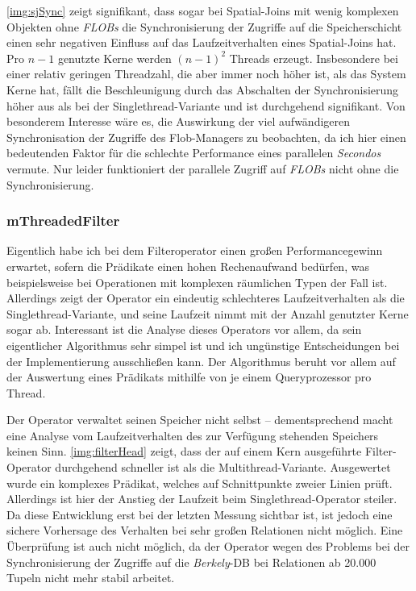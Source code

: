 \documentclass[a4paper,12pt,twoside]{article}
\newcommand{\Fb}[1]{\textit{#1}} %
\begin{document}
\autoref{img:sjSync} zeigt signifikant, dass sogar bei Spatial-Joins mit wenig komplexen Objekten ohne \Fb{FLOBs} die Synchronisierung der Zugriffe auf die Speicherschicht einen sehr negativen Einfluss auf das Laufzeitverhalten eines Spatial-Joins hat. Pro $n-1$ genutzte Kerne werden $(n-1)^2$ Threads erzeugt. Insbesondere bei einer relativ geringen Threadzahl, die aber immer noch höher ist, als das System Kerne hat, fällt die Beschleunigung durch das Abschalten der Synchronisierung höher aus als bei der Singlethread-Variante und ist durchgehend signifikant. Von besonderem Interesse wäre es, die Auswirkung der viel aufwändigeren Synchronisation der Zugriffe des Flob-Managers zu beobachten, da ich hier einen bedeutenden Faktor für die schlechte Performance eines parallelen \Fb{Secondos} vermute. Nur leider funktioniert der parallele Zugriff auf \Fb{FLOBs} nicht ohne die Synchronisierung.   

\subsubsection{mThreadedFilter}
\label{entw:filter}

Eigentlich habe ich bei dem Filteroperator einen großen Performancegewinn erwartet, sofern die Prädikate einen hohen Rechenaufwand bedürfen, was beispielsweise bei Operationen mit komplexen räumlichen Typen der Fall ist. Allerdings zeigt der Operator ein eindeutig schlechteres Laufzeitverhalten als die Singlethread-Variante, und seine Laufzeit nimmt mit der Anzahl genutzter Kerne sogar ab. Interessant ist die Analyse dieses Operators vor allem, da sein eigentlicher Algorithmus sehr simpel ist und ich ungünstige Entscheidungen bei der Implementierung ausschließen kann. Der Algorithmus beruht vor allem auf der Auswertung eines Prädikats mithilfe von je einem Queryprozessor pro Thread.
  
Der Operator verwaltet seinen Speicher nicht selbst -- dementsprechend macht eine Analyse vom Laufzeitverhalten des zur Verfügung stehenden Speichers keinen Sinn. \autoref{img:filterHead} zeigt, dass der auf einem Kern ausgeführte Filter-Operator durchgehend schneller ist als die Multithread-Variante. Ausgewertet wurde ein komplexes Prädikat, welches auf Schnittpunkte zweier Linien prüft. Allerdings ist hier der Anstieg der Laufzeit beim Singlethread-Operator steiler. Da diese Entwicklung erst bei der letzten Messung sichtbar ist, ist jedoch eine sichere Vorhersage des Verhalten bei sehr großen Relationen nicht möglich. Eine Überprüfung ist auch nicht möglich, da der Operator wegen des Problems bei der Synchronisierung der Zugriffe auf die \Fb{Berkely}-DB bei Relationen ab 20.000 Tupeln nicht mehr stabil arbeitet. 
\end{document}
